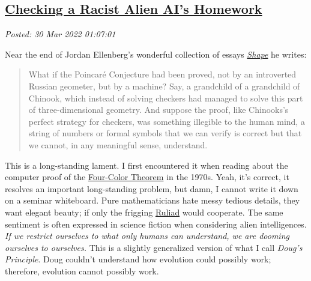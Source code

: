%

\subsection*{\href{http://analyzethedatanotthedrivel.org/2022/03/29/checking-a-racist-alien-ais-homework/}{Checking a Racist Alien AI's Homework}}


\noindent\emph{Posted: 30 Mar 2022 01:07:01}
\vspace{6pt}

Near the end of Jordan Ellenberg's wonderful collection of essays
\emph{\href{https://www.jordanellenberg.com/book/shape/}{Shape}} he
writes:

\begin{quote}
What if the Poincaré Conjecture had been proved, not by an introverted
Russian geometer, but by a machine? Say, a grandchild of a grandchild of
Chinook, which instead of solving checkers had managed to solve this
part of three-dimensional geometry. And suppose the proof, like
Chinooks's perfect strategy for checkers, was something illegible to the
human mind, a string of numbers or formal symbols that we can verify is
correct but that we cannot, in any meaningful sense, understand.
\end{quote}

This is a long-standing lament. I first encountered it when reading
about the computer proof of the
\href{https://people.cs.umass.edu/~brun/pubs/pubs/Brun02four-color.pdf}{Four-Color
Theorem} in the 1970s. Yeah, it's correct, it resolves an important
long-standing problem, but damn, I cannot write it down on a seminar
whiteboard. Pure mathematicians hate messy tedious details, they want
elegant beauty; if only the frigging
\href{https://writings.stephenwolfram.com/2021/11/the-concept-of-the-ruliad/}{Ruliad}
would cooperate. The same sentiment is often expressed in science
fiction when considering alien intelligences. \emph{If we restrict
ourselves to what only humans can understand, we are dooming ourselves
to ourselves.} This is a slightly generalized version of what I call
\emph{Doug's Principle}. Doug couldn't understand how evolution could
possibly work; therefore, evolution cannot possibly work.

